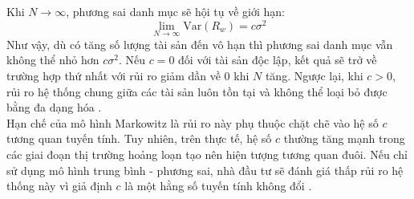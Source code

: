 \eea
Khi $N \to \infty$, phương sai danh mục sẽ hội tụ về giới hạn:
$$\lim_{N \to \infty} \text{Var}(R_w) = c\sigma^2$$ 
Như vậy, dù có tăng số lượng tài sản đến vô hạn thì phương sai danh mục vẫn không thể nhỏ hơn $c\sigma^2$. Nếu $c = 0$ đối với tài sản độc lập, kết quả sẽ trở về trường hợp thứ nhất với rủi ro giảm dần về $0$ khi $N$ tăng. Ngược lại, khi $c > 0$, rủi ro hệ thống chung giữa các tài sản luôn tồn tại và không thể loại bỏ được bằng đa dạng hóa \cite{markowitz1952portfolio}.\\
Hạn chế của mô hình Markowitz là rủi ro này phụ thuộc chặt chẽ vào hệ số $c$ tương quan tuyến tính. Tuy nhiên, trên thực tế, hệ số $c$ thường tăng mạnh trong các giai đoạn thị trường hoảng loạn tạo nên hiện tượng tương quan đuôi. Nếu chỉ sử dụng mô hình trung bình - phương sai, nhà đầu tư sẽ đánh giá thấp rủi ro hệ thống này vì giả định $c$ là một hằng số tuyến tính không đổi \cite{mcneil2015quantitative}.